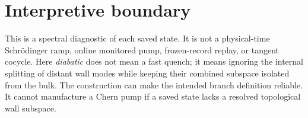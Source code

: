 \documentclass[aps,prb,twocolumn,floatfix,nofootinbib]{revtex4-2}
\begin{document}
\section{Interpretive boundary}

This is a spectral diagnostic of each saved state.  It is not a physical-time
Schr\"odinger ramp, online monitored pump, frozen-record replay, or tangent
cocycle.  Here \emph{diabatic} does not mean a fast quench; it means ignoring
the internal splitting of distant wall modes while keeping their combined
subspace isolated from the bulk.  The construction can make the intended
branch definition reliable.  It cannot manufacture a Chern pump if a saved
state lacks a resolved topological wall subspace.
\end{document}

